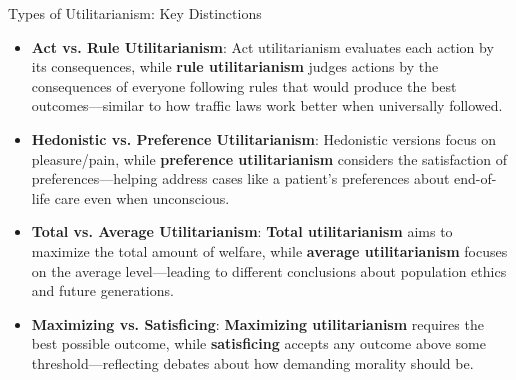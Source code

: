 \documentclass[aspectratio=169]{beamer}
\begin{document}
\begin{frame}{Types of Utilitarianism: Key Distinctions}
    \begin{itemize}
        \item \textbf{Act vs. Rule Utilitarianism}: Act utilitarianism evaluates each action by its consequences, while \textbf{rule utilitarianism} judges actions by the consequences of everyone following rules that would produce the best outcomes—similar to how traffic laws work better when universally followed.
        
        \item \textbf{Hedonistic vs. Preference Utilitarianism}: Hedonistic versions focus on pleasure/pain, while \textbf{preference utilitarianism} considers the satisfaction of preferences—helping address cases like a patient's preferences about end-of-life care even when unconscious.
        
        \item \textbf{Total vs. Average Utilitarianism}: \textbf{Total utilitarianism} aims to maximize the total amount of welfare, while \textbf{average utilitarianism} focuses on the average level—leading to different conclusions about population ethics and future generations.
        
        \item \textbf{Maximizing vs. Satisficing}: \textbf{Maximizing utilitarianism} requires the best possible outcome, while \textbf{satisficing} accepts any outcome above some threshold—reflecting debates about how demanding morality should be.
    \end{itemize}
\end{frame}
\end{document}
